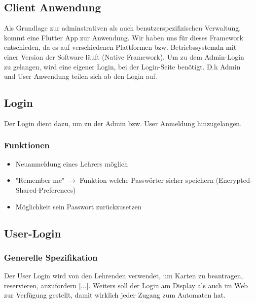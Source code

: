 \documentclass[a4paper]{article}
\begin{document}
\newpage

\subsection{Client Anwendung}
Als Grundlage zur adminstrativen als auch benutzerspezifizischen Verwaltung, kommt eine Flutter App zur Anwendung. Wir haben uns für dieses Framework entschieden, da es auf verschiedenen Plattformen bzw. Betriebssystemdn mit einer Version der Software läuft (Native Framework). Um zu dem Admin-Login zu gelangen, wird eine eigener Login, bei der Login-Seite benötigt. D.h Admin und User Anwendung teilen sich ab den Login auf.

\subsection{Login}
Der Login dient dazu, um zu der Admin bzw. User Anmeldung hinzugelangen.
\subsubsection{Funktionen}
\begin{itemize}
  \item Neuanmeldung eines Lehrers möglich
  \item "Remember me" $\rightarrow$ Funktion welche Passwörter sicher speichern (Encrypted-Shared-Preferences)
  \item Möglichkeit sein Passwort zurückzusetzen  
\end{itemize}

\subsection{User-Login}
\subsubsection{Generelle Spezifikation}
Der User Login wird von den Lehrenden verwendet, um Karten zu beantragen, reservieren, anzufordern [...]. Weiters soll der Login am Display als auch im Web zur Verfügung gestellt, damit wirklich jeder Zugang zum Automaten hat. 
\end{document}
